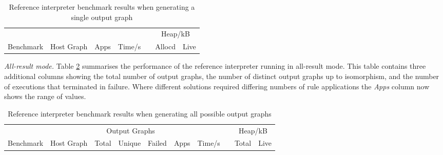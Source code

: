 \begin{table}[t]
\begin{minipage}{\textwidth}
\centering

\begin{tabular}{llrrcrr}
\hline 
&  & & & & \multicolumn{2}{c}{Heap/kB}\\
Benchmark          & Host Graph & Apps & Time/s   & & Allocd & Live \\
\hline 

\end{tabular}

\caption[Reference interpreter benchmarks]{Reference interpreter benchmark results when generating a single output graph}

\label{table:resultsSingle}
\end{minipage}
\end{table}





\vspace{.5\baselineskip}
\noindent
\emph{All-result mode.}
Table \ref{table:resultsAll} summarises the performance of the reference interpreter running in all-result mode. This table contains three additional columns showing the total number of output graphs, the number of distinct output graphs up to isomorphism, and the number of executions that terminated in failure.
Where different solutions required differing numbers of rule applications the \textit{Apps} column now shows the range of values.


\begin{table}[t]
\begin{minipage}{\textwidth}
\centering

\begin{tabular}{llrrrrrcrr}
\hline 
&  & \multicolumn{3}{c}{Output Graphs} & & && \multicolumn{2}{c}{Heap/kB}\\
Benchmark          & Host Graph & Total & Unique   & Failed & Apps & Time/s   & & Total  & Live \\
\hline 

\end{tabular}

\caption[Reference interpreter benchmarks]{Reference interpreter benchmark results when generating all possible output graphs}

\label{table:resultsAll}
\end{minipage}
\end{table}


